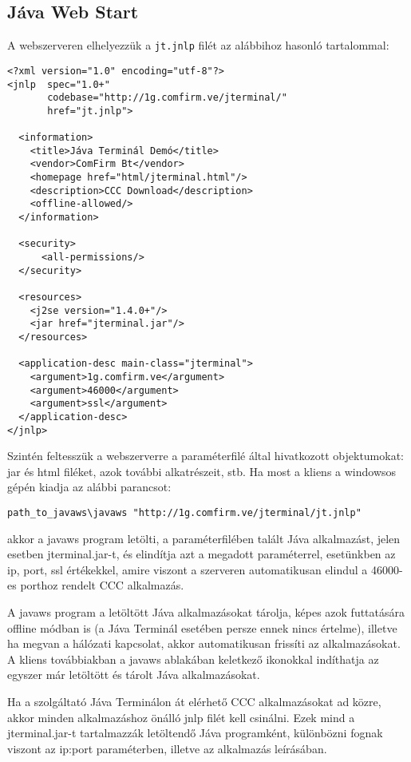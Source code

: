 \subsection{Jáva Web Start}

A webszerveren elhelyezzük a \verb!jt.jnlp! 
filét az alábbihoz hasonló tartalommal:
\begin{verbatim}
<?xml version="1.0" encoding="utf-8"?> 
<jnlp  spec="1.0+"  
       codebase="http://1g.comfirm.ve/jterminal/" 
       href="jt.jnlp"> 

  <information> 
    <title>Jáva Terminál Demó</title> 
    <vendor>ComFirm Bt</vendor> 
    <homepage href="html/jterminal.html"/> 
    <description>CCC Download</description> 
    <offline-allowed/> 
  </information> 

  <security> 
      <all-permissions/> 
  </security> 

  <resources> 
    <j2se version="1.4.0+"/> 
    <jar href="jterminal.jar"/> 
  </resources> 

  <application-desc main-class="jterminal"> 
    <argument>1g.comfirm.ve</argument> 
    <argument>46000</argument> 
    <argument>ssl</argument> 
  </application-desc> 
</jnlp> 
\end{verbatim}

Szintén feltesszük a webszerverre a paraméterfilé által 
hivatkozott objektumokat: jar és html filéket, azok további 
alkatrészeit, stb.
Ha most a kliens a windowsos gépén kiadja az alábbi parancsot:

\begin{verbatim}
path_to_javaws\javaws "http://1g.comfirm.ve/jterminal/jt.jnlp"
\end{verbatim}

akkor a javaws program letölti, a paraméterfilében talált 
Jáva alkalmazást, jelen esetben jterminal.jar-t, és elindítja azt a 
megadott  paraméterrel, esetünkben az ip, port, ssl értékekkel,
amire viszont a szerveren automatikusan elindul a
46000-es porthoz rendelt CCC alkalmazás.

A javaws program a letöltött Jáva alkalmazásokat tárolja, 
képes azok futtatására offline módban is (a Jáva Terminál esetében
persze ennek nincs értelme), illetve ha megvan a 
hálózati kapcsolat, akkor automatikusan frissíti az alkalmazásokat.
A kliens  továbbiakban a javaws ablakában keletkező ikonokkal indíthatja 
az egyszer már letöltött és tárolt Jáva alkalmazásokat.

Ha a szolgáltató Jáva Terminálon át elérhető CCC alkalmazásokat
ad közre, akkor minden alkalmazáshoz önálló jnlp filét kell
csinálni. Ezek mind a jterminal.jar-t tartalmazzák letöltendő
Jáva programként, különbözni fognak viszont az ip:port paraméterben,
illetve az alkalmazás leírásában.


